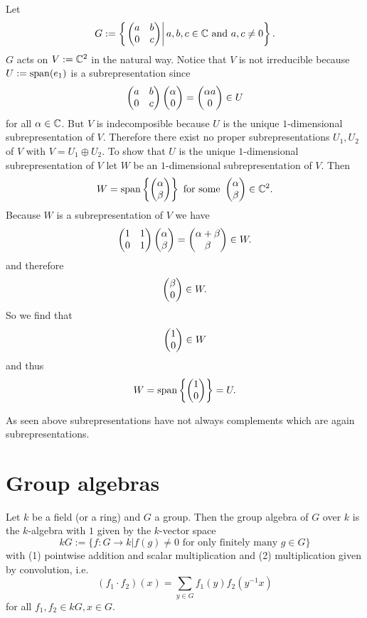 \begin{expl}
 Let
 \[
  G := \left\{ \left. \begin{pmatrix}a&b\\0&c\end{pmatrix} \right| a,b,c \in \mathbb{C} \text{ and } a, c \neq 0 \right\}.
 \]
 $G$ acts on $V := \mathbb{C}^2$ in the natural way. Notice that $V$ is not irreducible because $U := \operatorname{span}(e_1)$ is a subrepresentation since
 \[
  \begin{pmatrix}a&b\\0&c\end{pmatrix} \begin{pmatrix}\alpha\\0\end{pmatrix} = \begin{pmatrix}\alpha a\\0\end{pmatrix} \in U
 \]
 for all $\alpha \in \mathbb{C}$. But $V$ is indecomposible because $U$ is the unique $1$-dimensional subrepresentation of $V$.  Therefore there exist no proper subrepresentations $U_1, U_2$ of $V$ with $V = U_1 \oplus U_2$. To show that $U$ is the unique $1$-dimensional subrepresentation of $V$ let $W$ be an $1$-dimensional subrepresentation of $V$. Then
 \[
  W = \operatorname{span}\left\{ \begin{pmatrix}\alpha\\\beta\end{pmatrix} \right\} \text{ for some } \begin{pmatrix}\alpha\\\beta\end{pmatrix} \in \mathbb{C}^2.
 \]
 Because $W$ is a subrepresentation of $V$ we have
 \[
  \begin{pmatrix}1&1\\0&1\end{pmatrix} \begin{pmatrix}\alpha\\\beta\end{pmatrix} = \begin{pmatrix}\alpha+\beta\\\beta\end{pmatrix} \in W.
 \]
 and therefore
 \[
  \begin{pmatrix}\beta\\0\end{pmatrix} \in W.
 \]
 So we find that
 \[
  \begin{pmatrix}1\\0\end{pmatrix} \in W
 \]
 and thus
 \[
  W = \operatorname{span}\left\{\begin{pmatrix}1\\0\end{pmatrix}\right\} = U.
 \]
\end{expl}


\begin{warn}
 As seen above subrepresentations have not always complements which are again subrepresentations.
\end{warn}


\section{Group algebras}


\begin{defi}
 Let $k$ be a field (or a ring) and $G$ a group. Then the group algebra of $G$ over $k$ is the $k$-algebra with $1$ given by the $k$-vector space
 \[
  kG := \{f : G \to k | f(g) \neq 0 \text{ for only finitely many } g \in G\}
 \]
 with (1) pointwise addition and scalar multiplication and (2) multiplication given by convolution, i.e.
 \[
  (f_1 \cdot f_2)(x) = \sum_{y \in G} f_1(y) f_2\left(y^{-1}x\right)
 \]
 for all $f_1, f_2 \in kG, x \in G$.
\end{defi}

